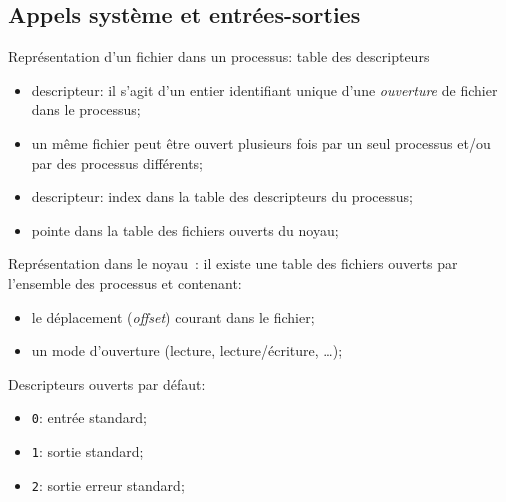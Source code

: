 \begin{frame}
\section{Appels syst\`eme et entr\'ees-sorties}
Repr\'esentation d'un fichier dans un processus: table des descripteurs
\begin{itemize}
\item descripteur: il s'agit d'un entier identifiant unique d'une {\em
    ouverture} de fichier dans le processus;
  \item un m\^eme fichier peut \^etre ouvert plusieurs fois par un seul
    processus et/ou par des processus diff\'erents;
  \item descripteur: index dans la table des descripteurs du processus;
  \item pointe dans la table des fichiers ouverts du noyau;
\end{itemize}
\par\medskip
Repr\'esentation dans le noyau~:
 il existe une table des fichiers ouverts par l'ensemble des processus et contenant:
    \begin{itemize}
      \item le d\'eplacement ({\em offset}) courant dans le fichier;
      \item un mode d'ouverture (lecture, lecture/\'ecriture, \ldots);
    \end{itemize}

\par\medskip
 Descripteurs ouverts par d\'efaut:
\begin{itemize}
  \item {\tt 0}: entr\'ee standard;
  \item {\tt 1}: sortie standard;
  \item {\tt 2}: sortie erreur standard;
\end{itemize}


\end{frame}

